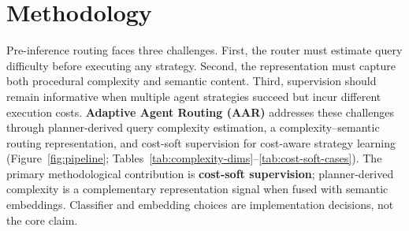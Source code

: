 \section{Methodology}
\label{sec:method}

Pre-inference routing faces three challenges.
First, the router must estimate query difficulty before executing any strategy.
Second, the representation must capture both procedural complexity and semantic content.
Third, supervision should remain informative when multiple agent strategies succeed but incur
different execution costs.
\textbf{Adaptive Agent Routing (AAR)} addresses these challenges through planner-derived query
complexity estimation, a complexity--semantic routing representation, and cost-soft supervision
for cost-aware strategy learning (Figure~\ref{fig:pipeline};
Tables~\ref{tab:complexity-dims}--\ref{tab:cost-soft-cases}).
The primary methodological contribution is \textbf{cost-soft supervision}; planner-derived
complexity is a complementary representation signal when fused with semantic embeddings.
Classifier and embedding choices are implementation decisions, not the core claim.

